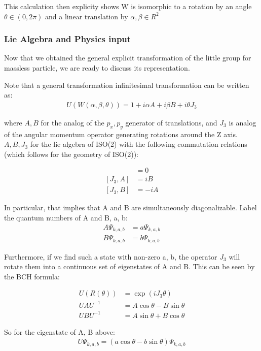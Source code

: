 \documentclass[12pt]{scrartcl}
\begin{document}
This calculation then explicity shows W is isomorphic to a rotation by an angle $\theta \in (0, 2 \pi)$ and a linear translation by $\alpha, \beta \in R^2$

\subsubsection{Lie Algebra and Physics input}

Now that we obtained the general explicit transformation of the little group for massless particle, we are ready to discuss its representation.

Note that a general transformation infinitesimal transformation can be written as:
\begin{align}
U(W(\alpha, \beta, \theta)) = 1 + i \alpha A + i \beta B + i \theta J_3
\end{align}

where $A, B$ for the analog of the $p_x, p_y$ generator of translations, and $J_3$  is analog of the angular momentum operator generating rotations around the Z axis.  $A, B, J_3$ for the lie algebra of ISO(2) with the following commutation relations (which follows for the geometry of ISO(2)):

\begin{align}
[A, B] &= 0 \\
[J_3, A] &= i B \\
[J_3, B] &=-iA
\end{align}

In particular, that implies that A and B are simultaneously diagonalizable.  Label the quantum numbers of A and B, a, b:
\begin{align}
A \Psi_{k, a, b} &= a \Psi_{k, a, b}  \\
B \Psi_{k, a, b} &= b \Psi_{k, a, b} 
\end{align}

Furthermore, if we find such a state with non-zero a, b, the operator $J_3$ will rotate them into a continuous set of eigenstates of A and B.  This can be seen by the BCH formula:

\begin{align}
U(R(\theta)) &= \exp(i J_3 \theta) \\
  U A U^{-1} &= A \cos \theta - B \sin \theta \\
 U B U^{-1} &= A \sin \theta + B \cos \theta 
\end{align}

So for the eigenstate of A, B above:
\begin{align}
U \Psi_{k, a, b} = \left(a \cos \theta - b \sin \theta \right) \Psi_{k, a, b} 
\end{align}
\end{document}
